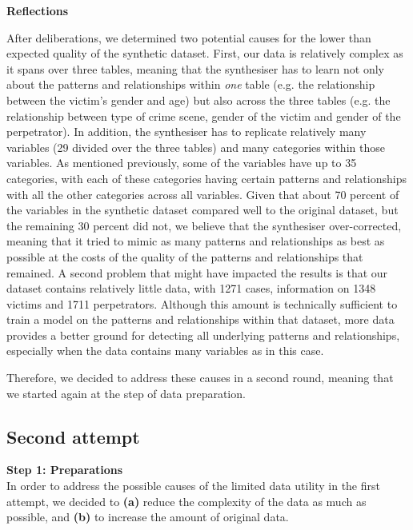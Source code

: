 \textbf{Reflections}

After deliberations, we determined two potential causes for the lower than expected quality of the synthetic dataset. First, our data is relatively complex as it spans over three tables, meaning that the synthesiser has to learn not only about the patterns and relationships within \textit{one} table (e.g. the relationship between the victim's gender and age) but also across the three tables (e.g. the relationship between type of crime scene, gender of the victim and gender of the perpetrator). In addition, the synthesiser has to replicate relatively many variables (29 divided over the three tables) and many categories within those variables. As mentioned previously, some of the variables have up to 35 categories, with each of these categories having certain patterns and relationships with all the other categories across all variables. Given that about 70 percent of the variables in the synthetic dataset compared well to the original dataset, but the remaining 30 percent did not, we believe that the synthesiser over-corrected, meaning that it tried to mimic as many patterns and relationships as best as possible at the costs of the quality of the patterns and relationships that remained. A second problem that might have impacted the results is that our dataset contains relatively little data, with 1271 cases, information on 1348 victims and 1711 perpetrators. Although this amount is technically sufficient to train a model on the patterns and relationships within that dataset, more data provides a better ground for detecting all underlying patterns and relationships, especially when the data contains many variables as in this case.

Therefore, we decided to address these causes in a second round, meaning that we started again at the step of data preparation. 


\subsection{Second attempt}

\textbf{Step 1: Preparations}\\
In order to address the possible causes of the limited data utility in the first attempt, we decided to \textbf{(a)} reduce the complexity of the data as much as possible, and \textbf{(b)} to increase the amount of original data.

